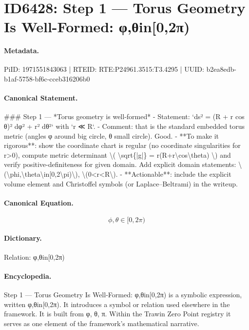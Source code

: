 \section*{ID6428: Step 1 — Torus Geometry Is Well-Formed: φ,θin[0,2π)}
\paragraph{Metadata.}
PiID: 1971551843063 | RTEID: RTE:P24961.3515:T3.4295 | UUID: b2ea8edb-b1af-5758-bf6c-cceb316206b0

\paragraph{Canonical Statement.}
\#\#\# Step 1 — *Torus geometry is well-formed* - Statement: `ds² = (R + r cos θ)² dφ² + r² dθ²` with `r ≪ R`. - Comment: that is the standard embedded torus metric (angles φ around big circle, θ small circle). Good. - **To make it rigorous**: show the coordinate chart is regular (no coordinate singularities for r>0), compute metric determinant \textbackslash{}( \textbackslash{}sqrt\{|g|\} = r(R+r\textbackslash{}cos\textbackslash{}theta) \textbackslash{}) and verify positive-definiteness for given domain. Add explicit domain statements: \textbackslash{}(\textbackslash{}phi,\textbackslash{}theta\textbackslash{}in[0,2\textbackslash{}pi)\textbackslash{}), \textbackslash{}(0<r<R\textbackslash{}). - **Actionable**: include the explicit volume element and Christoffel symbols (or Laplace–Beltrami) in the writeup.

\paragraph{Canonical Equation.}
\[
\phi,\theta\in[0,2\pi)
\]

\paragraph{Dictionary.}
Relation: φ,θin[0,2π)

\paragraph{Encyclopedia.}
Step 1 — Torus Geometry Is Well-Formed: φ,θin[0,2π) is a symbolic expression, written φ,θin[0,2π). It introduces a symbol or relation used elsewhere in the framework. It is built from φ, θ, π. Within the Trawin Zero Point registry it serves as one element of the framework's mathematical narrative.
